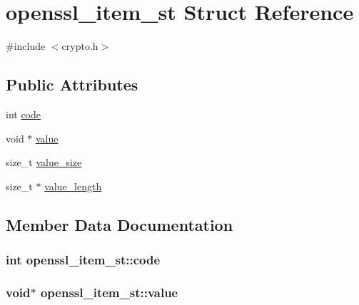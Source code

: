 \hypertarget{structopenssl__item__st}{}\section{openssl\+\_\+item\+\_\+st Struct Reference}
\label{structopenssl__item__st}


{\ttfamily \#include $<$crypto.\+h$>$}

\subsection*{Public Attributes}
\begin{DoxyCompactItemize}
\item 
int \hyperlink{structopenssl__item__st_a5e174401dbd1505959e9fab66d07530e}{code}
\item 
void $\ast$ \hyperlink{structopenssl__item__st_a98e9b9c11f757937cee8119f22c3e116}{value}
\item 
size\+\_\+t \hyperlink{structopenssl__item__st_ab073a992ed1a5ba36d5e8627ca42e93d}{value\+\_\+size}
\item 
size\+\_\+t $\ast$ \hyperlink{structopenssl__item__st_a1df8749d942642c9a3d867bd574d647a}{value\+\_\+length}
\end{DoxyCompactItemize}


\subsection{Member Data Documentation}
\subsubsection[{\texorpdfstring{code}{code}}]{\setlength{\rightskip}{0pt plus 5cm}int openssl\+\_\+item\+\_\+st\+::code}\hypertarget{structopenssl__item__st_a5e174401dbd1505959e9fab66d07530e}{}\label{structopenssl__item__st_a5e174401dbd1505959e9fab66d07530e}
\subsubsection[{\texorpdfstring{value}{value}}]{\setlength{\rightskip}{0pt plus 5cm}void$\ast$ openssl\+\_\+item\+\_\+st\+::value}\hypertarget{structopenssl__item__st_a98e9b9c11f757937cee8119f22c3e116}{}\label{structopenssl__item__st_a98e9b9c11f757937cee8119f22c3e116}
